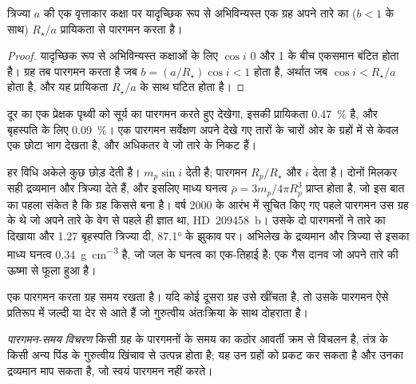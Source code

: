\begin{proposition}[पारगमन प्रायिकता]\label{prop:b3:exoplanets:probability}
त्रिज्या $a$ की एक वृत्ताकार कक्षा पर यादृच्छिक रूप से अभिविन्यस्त एक ग्रह
अपने तारे का ($b < 1$ के साथ) $R_\star/a$ प्रायिकता से पारगमन करता है।
\end{proposition}

\begin{proof}
यादृच्छिक रूप से अभिविन्यस्त कक्षाओं के लिए $\cos i$ 0 और 1 के बीच एकसमान बंटित होता है।
ग्रह तब पारगमन करता है जब $b = (a/R_\star)\cos i < 1$ होता है, अर्थात
जब $\cos i < R_\star/a$ होता है, और यह प्रायिकता $R_\star/a$ के साथ घटित होता है।
\end{proof}

दूर का एक प्रेक्षक पृथ्वी को सूर्य का पारगमन करते हुए देखेगा, इसकी प्रायिकता
\qty{0.47}{\percent} है, और बृहस्पति के लिए \qty{0.09}{\percent}। एक पारगमन
सर्वेक्षण अपने देखे गए तारों के चारों ओर के ग्रहों में से केवल एक छोटा भाग देखता है,
और अधिकतर वे जो तारे के निकट हैं।

हर विधि अकेले कुछ छोड़ देती है। 
$m_p\sin i$ देती है; पारगमन $R_p/R_\star$ और $i$ देता है। दोनों मिलकर
सही द्रव्यमान और त्रिज्या देते हैं, और इसलिए माध्य घनत्व
$\bar\rho = 3m_p/4\pi R_p^3$ प्राप्त होता है, जो इस बात का पहला संकेत है कि ग्रह किससे बना है।
वर्ष 2000 के आरंभ में सूचित किए गए पहले पारगमन उस ग्रह के थे जो अपने तारे के वेग से
पहले ही ज्ञात था, HD~209458~b। उसके दो पारगमनों ने
तारे का  दिखाया और 1.27 बृहस्पति त्रिज्या दी,
\ang{87.1} के झुकाव पर। अभिलेख के द्रव्यमान और त्रिज्या से इसका माध्य घनत्व
\qty{0.34}{g.cm^{-3}} है, जो जल के घनत्व का एक-तिहाई है: एक गैस दानव जो
अपने तारे की ऊष्मा से फूला हुआ है।

एक पारगमन करता ग्रह समय रखता है। यदि कोई दूसरा ग्रह उसे खींचता है, तो उसके
पारगमन ऐसे प्रतिरूप में जल्दी या देर से आते हैं जो
गुरुत्वीय अंतःक्रिया के साथ दोहराता है।

\begin{definition}\label{def:b3:exoplanets:ttv}
\emph{पारगमन-समय विचरण} किसी ग्रह के पारगमनों के समय का
कठोर आवर्ती क्रम से विचलन है,
तंत्र के किसी अन्य पिंड के गुरुत्वीय खिंचाव से उत्पन्न होता है;
यह उन ग्रहों को प्रकट कर सकता है और उनका द्रव्यमान माप सकता है,
जो स्वयं पारगमन नहीं करते।
\end{definition}

